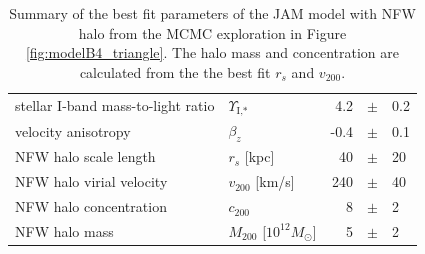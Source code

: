 \begin{table}
\centering
\begin{tabular}{llrcl}
\hline
stellar I-band mass-to-light ratio & $\Upsilon_\text{I,*}$ & 4.2 & $\pm$ & 0.2\\
velocity anisotropy & $\beta_z$ & -0.4 & $\pm$ & 0.1 \\
NFW halo scale length & $r_s$ [kpc] & 40 & $\pm$ & 20\\
NFW halo virial velocity & $v_{200}$ [km/s] & 240 & $\pm$ & 40\\
NFW halo concentration & $c_{200}$ & 8 & $\pm$ & 2 \\
NFW halo mass & $M_{200}$ [$10^{12} M_\odot$] & 5 & $\pm$ & 2\\
\hline
\end{tabular}
\caption{Summary of the best fit parameters of the JAM model with NFW halo from the MCMC exploration in Figure \ref{fig:modelB4_triangle}. The halo mass and concentration are calculated from the the best fit $r_s$ and $v_{200}$.}
\label{tab:modelB4_bestfit}
\end{table}


